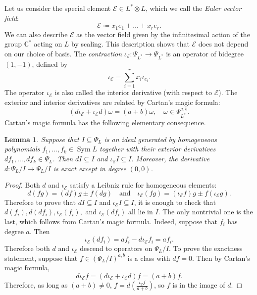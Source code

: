 \documentclass{amsart}
\newtheorem{lemma}[theorem]{Lemma}
\newcommand{\Sym}{\operatorname{Sym}}
\newcommand{\F}{\mathbb{C}}
\theoremstyle{definition}
\begin{document}
Let us consider the special element $\mathcal{E} \in L^* \otimes L$, which 
we call the \emph{Euler vector field}:
\[
    \mathcal{E} \coloneqq x_1e_1 + \ldots + x_re_r.
\]
We can also describe $\mathcal{E}$ as the vector field given by the 
infinitesimal action of the group $\F^*$ acting on $L$ by scaling.
This description shows that $\mathcal{E}$ does not depend on our choice of basis.
The \emph{contraction} $\iota_{\mathcal{E}}\colon \Psi_{L^*} \to 
\Psi_{L^*}$ is an operator of bidegree $(1,-1)$, defined by
\[
    \iota_{\mathcal{E}} = \sum_{i = 1}^r x_i \iota_{e_i}.
\]
The operator $\iota_{\mathcal{E}}$ is also called the interior 
derivative (with respect to $\mathcal{E}$). The exterior and interior 
derivatives are related by Cartan's magic formula:
\[
    (d\iota_{\mathcal{E}} + \iota_{\mathcal{E}}d) \omega = (a+b)\omega,\quad 
    \omega \in \Psi_{L^*}^{a,b}.
\]
Cartan's magic formula has the following elementary consequence.
\begin{lemma}\label{lem:diffclosedexact}
    Suppose that $I \subseteq \Psi_L$ is an ideal generated by homogeneous polynomials
    $f_1, \ldots, f_k \in \Sym L$ together with their exterior derivatives 
    $df_1, \ldots, df_k \in \Psi_L$. Then $dI \subseteq I$ and 
    $\iota_{\mathcal{E}} I \subseteq I$. Moreover, the derivative $d \colon \Psi_L/I \to \Psi_L/I$ is exact except in degree $(0,0)$.
\end{lemma}
\begin{proof}
    Both $d$ and $\iota_{\mathcal{E}}$ satisfy a Leibniz rule for homogeneous elements:
    \[
        d(fg) = (df)g \pm f(dg)\quad \text{and} \quad 
        \iota_{\mathcal{E}}(fg) = (\iota_{\mathcal{E}} f)g \pm 
        f(\iota_{\mathcal{E}} g).
    \]
    Therefore to prove that $dI \subseteq I$ and $\iota_{\mathcal{E}}I 
    \subseteq I$, it is enough to check that $d(f_i), d(df_i), 
    \iota_{\mathcal{E}}(f_i),$ and $\iota_{\mathcal{E}}(df_i)$ all lie in $I$. The only 
    nontrivial one is the last, which follows from Cartan's magic 
    formula. Indeed, suppose that $f_i$ has degree $a$. Then
    \[
        \iota_{\mathcal{E}}(df_i) = a f_i - d\iota_{\mathcal{E}}f_i 
    = a f_i.
    \]
    Therefore both $d$ and $\iota_{\mathcal{E}}$ descend to operators on 
    $\Psi_{L}/I$. To prove the exactness statement, suppose that $f \in 
    (\Psi_L/I)^{a,b}$ is a class with $df = 0$. Then by Cartan's magic formula,
    \[
        d\iota_{\mathcal{E}} f = (d\iota_{\mathcal{E}} + \iota_{\mathcal{E}}d)f = (a+b)f.
    \]
    Therefore, as long as $(a+b) \not= 0$, $f = d 
    (\frac{\iota_{\mathcal{E}}f}{a+b})$, so $f$ is in the image of $d$. 
\end{proof}
\end{document}
